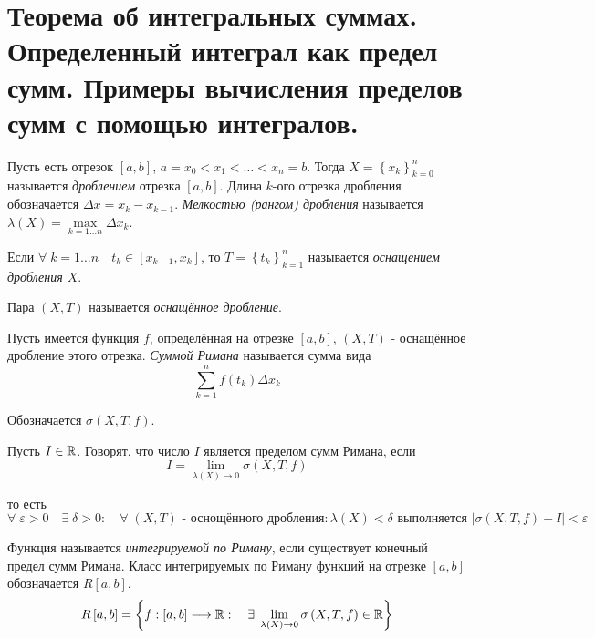 \documentclass[../main.tex]{subfiles}
\begin{document}
\newpage
\section{Теорема об интегральных суммах. Определенный интеграл как предел сумм. Примеры вычисления пределов сумм с помощью интегралов.}
Пусть есть отрезок \( \left[ a,b\right]\), \( a=x_0<x_1< \ldots <x_n=b\). Тогда \( X=\left\{ x_k\right\}_{k=0}^n\) называется \emph{дроблением} отрезка \( \left[ a,b\right]\). 
Длина \( k\)-ого отрезка дробления обозначается \( \Delta x=x_k-x_{k-1}\). \emph{Мелкостью (рангом) дробления} называется \( \lambda \left( X\right)= \max\limits_{ k=1 \ldots n} \Delta x_k\). 

Если \( \forall \; k=1 \ldots n\quad t_k \in \left[ x_{k-1}, x_k\right]\), то \( T=\left\{ t_k\right\}_{k=1}^n\) называется \emph{оснащением дробления \( X\)}. 

Пара \( \left( X,T\right)\) называется \emph{оснащённое дробление}. 

Пусть имеется функция \( f\), определённая на отрезке \( \left[ a,b\right]\), \( \left( X,T\right)\) - оснащённое дробление этого отрезка. \emph{Суммой Римана} называется сумма вида 
\[ \sum\limits_{ k=1}^{ n} f\left( t_k\right) \Delta x_k\]

Обозначается \( \sigma\left( X,T,f\right)\).

Пусть \( I \in \mathbb{R} \). Говорят, что число \( I\) является пределом сумм Римана, если 
\[ I= \lim\limits_{ \lambda \left( X\right)\rightarrow 0} \sigma\left( X, T, f\right)\]

то есть 
\[ \forall \; \varepsilon >0\quad  \exists \; \delta >0:\quad \forall \; \left( X,T\right) \text{ - оснощённого дробления}: \lambda \left( X\right)< \delta \text{ выполняется } \left| \sigma\left( X,T,f\right)-I\right|< \varepsilon \]

Функция называется \emph{интегрируемой по Риману}, если существует конечный предел сумм Римана. Класс интегрируемых по Риману функций на отрезке \( \left[ a,b\right]\) обозначается \( R \left[ a,b\right]\).
\[ R\left[ a,b\right]=\left\{ f:\left[ a,b\right] \longrightarrow \mathbb{R} :\quad \exists \; \lim\limits_{ \lambda \left( X\right)\rightarrow0} \sigma\left( X,T,f\right) \in \mathbb{R} \right\}\]
\end{document}
